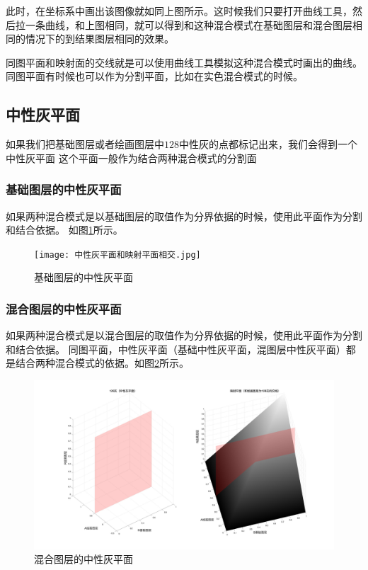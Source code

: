 此时，在坐标系中画出该图像就如同上图所示。这时候我们只要打开曲线工具，然后拉一条曲线，和上图相同，就可以得到和这种混合模式在基础图层和混合图层相同的情况下的到结果图层相同的效果。

同图平面和映射面的交线就是可以使用曲线工具模拟这种混合模式时画出的曲线。同图平面有时候也可以作为分割平面，比如在实色混合模式的时候。

\subsection{ 中性灰平面}
如果我们把基础图层或者绘画图层中$128$中性灰的点都标记出来，我们会得到一个中性灰平面
这个平面一般作为结合两种混合模式的分割面
\subsubsection{ 基础图层的中性灰平面}
如果两种混合模式是以基础图层的取值作为分界依据的时候，使用此平面作为分割和结合依据。 如图\ref{fig:basemidgray}所示。

\begin{figure}[!htb]
	\centering
	\texttt{[image: 中性灰平面和映射平面相交.jpg]}
	\caption{基础图层的中性灰平面}
	\label{fig:basemidgray}
\end{figure}
\subsubsection{ 混合图层的中性灰平面}
如果两种混合模式是以混合图层的取值作为分界依据的时候，使用此平面作为分割和结合依据。
同图平面，中性灰平面（基础中性灰平面，混图层中性灰平面）都是结合两种混合模式的依据。如图\ref{fig:blendmidgray}所示。
\begin{figure}[!htb]
	\centering
	\includegraphics[width=\linewidth]{figure/中性灰和映射平面2}
	\caption{混合图层的中性灰平面}
	\label{fig:blendmidgray}
\end{figure}
\newpage
